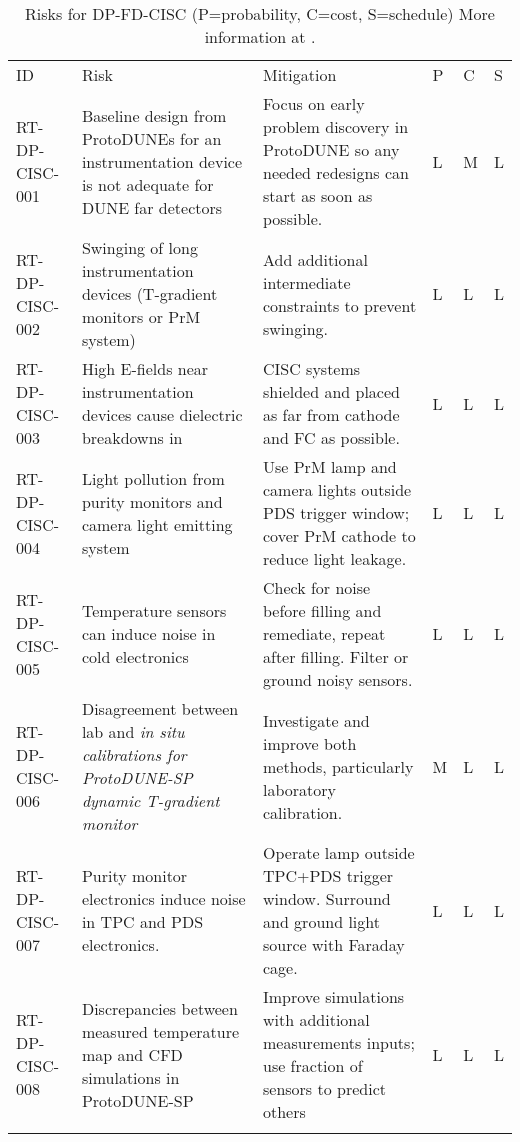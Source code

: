 
\begin{footnotesize}
\begin{longtable}{P{0.18\textwidth}P{0.20\textwidth}P{0.32\textwidth}P{0.02\textwidth}P{0.02\textwidth}P{0.02\textwidth}} 
\caption[Risks for DP-FD-CISC]{Risks for DP-FD-CISC (P=probability, C=cost, S=schedule) More information at . } \\
ID & Risk & Mitigation & P & C & S  \\  \colhline
RT-DP-CISC-001 & Baseline design from ProtoDUNEs for an instrumentation device is not adequate for DUNE far detectors & Focus on early problem discovery in ProtoDUNE so any needed redesigns can start as soon as possible. & L & M & L \\  \colhline
RT-DP-CISC-002 & Swinging of long instrumentation devices (T-gradient monitors or PrM system) & Add additional intermediate constraints to prevent swinging. & L & L & L \\  \colhline
RT-DP-CISC-003 & High E-fields near instrumentation devices cause dielectric breakdowns in  & CISC systems shielded and placed as far from cathode and FC as possible. & L & L & L \\  \colhline
RT-DP-CISC-004 & Light pollution from purity monitors and camera light emitting system & Use PrM lamp and camera lights outside PDS trigger window; cover PrM cathode to reduce light leakage. & L & L & L \\  \colhline
RT-DP-CISC-005 & Temperature sensors can induce noise in cold electronics & Check for noise before filling and remediate, repeat after filling. Filter or ground noisy sensors. & L & L  & L \\  \colhline
RT-DP-CISC-006 & Disagreement between lab and \em{in situ} calibrations for ProtoDUNE-SP dynamic T-gradient monitor & Investigate and improve both methods, particularly laboratory calibration. & M & L & L \\  \colhline
RT-DP-CISC-007 & Purity monitor electronics induce noise in TPC and PDS electronics. & Operate lamp outside TPC+PDS trigger window. Surround and ground light source with Faraday cage. & L & L & L \\  \colhline
RT-DP-CISC-008 & Discrepancies between measured temperature map and CFD simulations in ProtoDUNE-SP & Improve simulations with additional measurements inputs; use fraction of sensors to predict others   & L & L & L \\  \colhline

\end{longtable}
\end{footnotesize}
